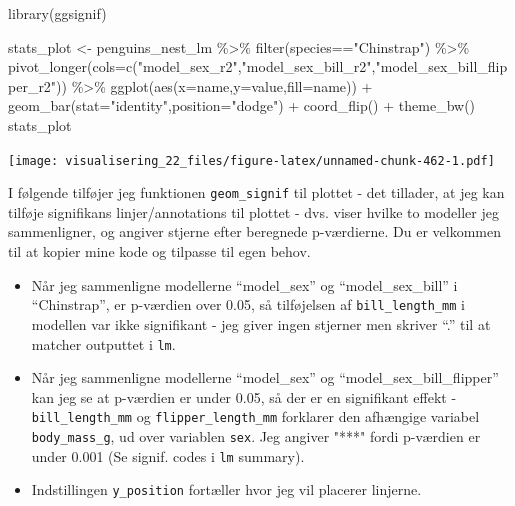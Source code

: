 \documentclass[
]{book}
\newenvironment{Shaded}{\begin{snugshade}}{\end{snugshade}}
\newcommand{\AttributeTok}[1]{\textcolor[rgb]{0.77,0.63,0.00}{#1}}
\newcommand{\FunctionTok}[1]{\textcolor[rgb]{0.00,0.00,0.00}{#1}}
\newcommand{\NormalTok}[1]{#1}
\newcommand{\OtherTok}[1]{\textcolor[rgb]{0.56,0.35,0.01}{#1}}
\newcommand{\SpecialCharTok}[1]{\textcolor[rgb]{0.00,0.00,0.00}{#1}}
\newcommand{\StringTok}[1]{\textcolor[rgb]{0.31,0.60,0.02}{#1}}
\providecommand{\tightlist}{%
  \setlength{\itemsep}{0pt}\setlength{\parskip}{0pt}}
\begin{document}
\begin{Shaded}
\begin{Highlighting}[]
\FunctionTok{library}\NormalTok{(ggsignif) }

\NormalTok{stats\_plot }\OtherTok{\textless{}{-}}\NormalTok{ penguins\_nest\_lm }\SpecialCharTok{\%\textgreater{}\%} 
  \FunctionTok{filter}\NormalTok{(species}\SpecialCharTok{==}\StringTok{"Chinstrap"}\NormalTok{) }\SpecialCharTok{\%\textgreater{}\%}
  \FunctionTok{pivot\_longer}\NormalTok{(}\AttributeTok{cols=}\FunctionTok{c}\NormalTok{(}\StringTok{"model\_sex\_r2"}\NormalTok{,}\StringTok{"model\_sex\_bill\_r2"}\NormalTok{,}\StringTok{"model\_sex\_bill\_flipper\_r2"}\NormalTok{)) }\SpecialCharTok{\%\textgreater{}\%}
  \FunctionTok{ggplot}\NormalTok{(}\FunctionTok{aes}\NormalTok{(}\AttributeTok{x=}\NormalTok{name,}\AttributeTok{y=}\NormalTok{value,}\AttributeTok{fill=}\NormalTok{name)) }\SpecialCharTok{+}
  \FunctionTok{geom\_bar}\NormalTok{(}\AttributeTok{stat=}\StringTok{"identity"}\NormalTok{,}\AttributeTok{position=}\StringTok{"dodge"}\NormalTok{)  }\SpecialCharTok{+}
  \FunctionTok{coord\_flip}\NormalTok{() }\SpecialCharTok{+}
  \FunctionTok{theme\_bw}\NormalTok{()}
\NormalTok{stats\_plot}
\end{Highlighting}
\end{Shaded}

\texttt{[image: visualisering\_22\_files/figure-latex/unnamed-chunk-462-1.pdf]}

I følgende tilføjer jeg funktionen \texttt{geom\_signif} til plottet - det tillader, at jeg kan tilføje signifikans linjer/annotations til plottet - dvs. viser hvilke to modeller jeg sammenligner, og angiver stjerne efter beregnede p-værdierne. Du er velkommen til at kopier mine kode og tilpasse til egen behov.

\begin{itemize}
\tightlist
\item
  Når jeg sammenligne modellerne ``model\_sex'' og ``model\_sex\_bill'' i ``Chinstrap'', er p-værdien over 0.05, så tilføjelsen af \texttt{bill\_length\_mm} i modellen var ikke signifikant - jeg giver ingen stjerner men skriver ``.'' til at matcher outputtet i \texttt{lm}.
\item
  Når jeg sammenligne modellerne ``model\_sex'' og ``model\_sex\_bill\_flipper'' kan jeg se at p-værdien er under 0.05, så der er en signifikant effekt - \texttt{bill\_length\_mm} og \texttt{flipper\_length\_mm} forklarer den afhængige variabel \texttt{body\_mass\_g}, ud over variablen \texttt{sex}. Jeg angiver "***" fordi p-værdien er under 0.001 (Se signif. codes i \texttt{lm} summary).
\item
  Indstillingen \texttt{y\_position} fortæller hvor jeg vil placerer linjerne.
\end{itemize}
\end{document}
